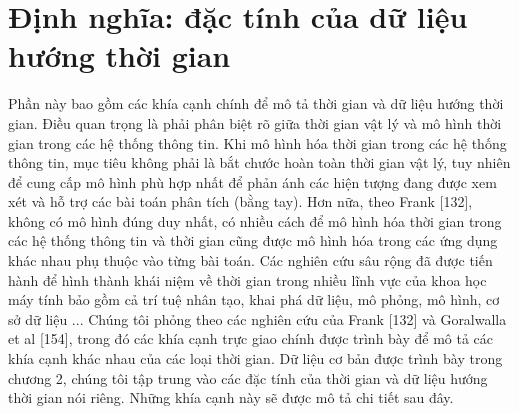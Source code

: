 \section{Định nghĩa: đặc tính của dữ liệu hướng thời gian}
Phần này bao gồm các khía cạnh chính để mô tả thời gian và dữ liệu hướng thời gian. Điều quan trọng là phải phân biệt rõ giữa thời gian vật lý và mô hình thời gian trong các hệ thống thông tin. Khi mô hình hóa thời gian trong các hệ thống thông tin, mục tiêu không phải là bắt chước hoàn toàn thời gian vật lý, tuy nhiên để cung cấp mô hình phù hợp nhất để phản ánh các hiện tượng đang được xem xét và hỗ trợ các bài toán phân tích (bằng tay). Hơn nữa, theo Frank [132], không có mô hình đúng duy nhất, có nhiều cách để mô hình hóa thời gian trong các hệ thống thông tin và thời gian cũng được mô hình hóa trong các ứng dụng khác nhau phụ thuộc vào từng bài toán. Các nghiên cứu sâu rộng đã được tiến hành để hình thành khái niệm về thời gian trong nhiều lĩnh vực của khoa học máy tính bảo gồm cả trí tuệ nhân tạo, khai phá dữ liệu, mô phỏng, mô hình, cơ sở dữ liệu ... Chúng tôi phỏng theo các nghiên cứu của Frank [132] và Goralwalla et al [154], trong đó các khía cạnh trực giao chính được trình bày để mô tả các khía cạnh khác nhau của các loại thời gian. Dữ liệu cơ bản được trình bày trong chương 2, chúng tôi tập trung vào các đặc tính của thời gian và dữ liệu hướng thời gian nói riêng. Những khía cạnh này sẽ được mô tả chi tiết sau đây.


